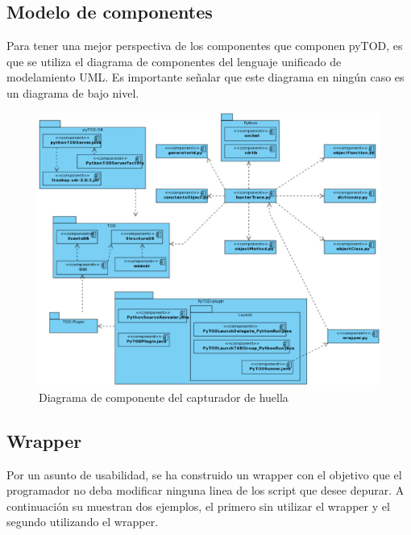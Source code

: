 \documentclass[12pt,legalpaper]{report}
\begin{document}
		\subsection{Modelo de componentes}

Para tener una mejor perspectiva de los componentes que componen pyTOD, es que se utiliza el diagrama de componentes del lenguaje unificado de modelamiento UML.  Es importante señalar que este diagrama en ningún caso es un diagrama de bajo nivel.		
\begin{figure}[hpb]
	\centering
	\includegraphics[scale=0.5]{images/componentModelHunterTrace.eps}
	\caption{Diagrama de componente del capturador de huella}
\end{figure}	
		
		
		\subsection{Wrapper}
		
Por un asunto de usabilidad, se ha construido un wrapper con el objetivo que el programador no deba modificar ninguna linea de los script que desee depurar.  A continuación su muestran dos ejemplos, el primero sin utilizar el wrapper y el segundo utilizando el wrapper.
\end{document}
